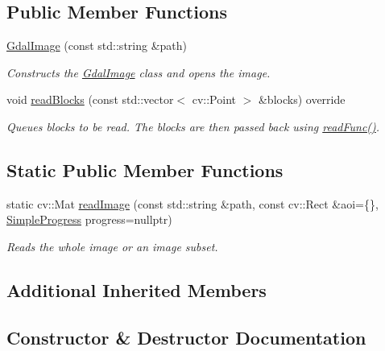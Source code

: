 \subsection*{Public Member Functions}
\begin{DoxyCompactItemize}
\item 
\hyperlink{classdg_1_1deepcore_1_1imagery_1_1_gdal_image_a2c05530c01c9cc6bf0d0f332b74cecc3}{Gdal\+Image} (const std\+::string \&path)
\begin{DoxyCompactList}\small\item\em Constructs the \hyperlink{classdg_1_1deepcore_1_1imagery_1_1_gdal_image}{Gdal\+Image} class and opens the image. \end{DoxyCompactList}\item 
void \hyperlink{classdg_1_1deepcore_1_1imagery_1_1_gdal_image_a6c89021966b51596c163a786b3a314c4}{read\+Blocks} (const std\+::vector$<$ cv\+::\+Point $>$ \&blocks) override
\begin{DoxyCompactList}\small\item\em Queues blocks to be read. The blocks are then passed back using \hyperlink{classdg_1_1deepcore_1_1imagery_1_1_geo_image_a2eb4fdc320aee10e8afd337138e2e7e1}{read\+Func()}. \end{DoxyCompactList}\end{DoxyCompactItemize}
\subsection*{Static Public Member Functions}
\begin{DoxyCompactItemize}
\item 
static cv\+::\+Mat \hyperlink{classdg_1_1deepcore_1_1imagery_1_1_gdal_image_ae91dd1db57e6511bee5a6af01242f202}{read\+Image} (const std\+::string \&path, const cv\+::\+Rect \&aoi=\{\}, \hyperlink{group___utility_module_ga6763018df79e4bdbcd8cd14cea5342b2}{Simple\+Progress} progress=nullptr)
\begin{DoxyCompactList}\small\item\em Reads the whole image or an image subset. \end{DoxyCompactList}\end{DoxyCompactItemize}
\subsection*{Additional Inherited Members}


\subsection{Constructor \& Destructor Documentation}
